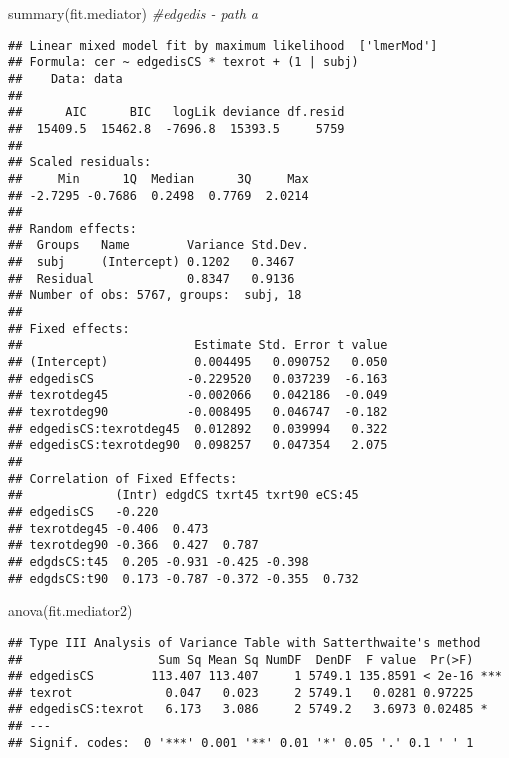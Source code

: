 \documentclass[
]{article}
\newenvironment{Shaded}{\begin{snugshade}}{\end{snugshade}}
\newcommand{\CommentTok}[1]{\textcolor[rgb]{0.56,0.35,0.01}{\textit{#1}}}
\newcommand{\FunctionTok}[1]{\textcolor[rgb]{0.00,0.00,0.00}{#1}}
\newcommand{\NormalTok}[1]{#1}
\begin{document}
\begin{Shaded}
\begin{Highlighting}[]
\FunctionTok{summary}\NormalTok{(fit.mediator) }\CommentTok{\#edgedis {-} path a}
\end{Highlighting}
\end{Shaded}

\begin{verbatim}
## Linear mixed model fit by maximum likelihood  ['lmerMod']
## Formula: cer ~ edgedisCS * texrot + (1 | subj)
##    Data: data
## 
##      AIC      BIC   logLik deviance df.resid 
##  15409.5  15462.8  -7696.8  15393.5     5759 
## 
## Scaled residuals: 
##     Min      1Q  Median      3Q     Max 
## -2.7295 -0.7686  0.2498  0.7769  2.0214 
## 
## Random effects:
##  Groups   Name        Variance Std.Dev.
##  subj     (Intercept) 0.1202   0.3467  
##  Residual             0.8347   0.9136  
## Number of obs: 5767, groups:  subj, 18
## 
## Fixed effects:
##                        Estimate Std. Error t value
## (Intercept)            0.004495   0.090752   0.050
## edgedisCS             -0.229520   0.037239  -6.163
## texrotdeg45           -0.002066   0.042186  -0.049
## texrotdeg90           -0.008495   0.046747  -0.182
## edgedisCS:texrotdeg45  0.012892   0.039994   0.322
## edgedisCS:texrotdeg90  0.098257   0.047354   2.075
## 
## Correlation of Fixed Effects:
##             (Intr) edgdCS txrt45 txrt90 eCS:45
## edgedisCS   -0.220                            
## texrotdeg45 -0.406  0.473                     
## texrotdeg90 -0.366  0.427  0.787              
## edgdsCS:t45  0.205 -0.931 -0.425 -0.398       
## edgdsCS:t90  0.173 -0.787 -0.372 -0.355  0.732
\end{verbatim}

\begin{Shaded}
\begin{Highlighting}[]
\FunctionTok{anova}\NormalTok{(fit.mediator2)}
\end{Highlighting}
\end{Shaded}

\begin{verbatim}
## Type III Analysis of Variance Table with Satterthwaite's method
##                   Sum Sq Mean Sq NumDF  DenDF  F value  Pr(>F)    
## edgedisCS        113.407 113.407     1 5749.1 135.8591 < 2e-16 ***
## texrot             0.047   0.023     2 5749.1   0.0281 0.97225    
## edgedisCS:texrot   6.173   3.086     2 5749.2   3.6973 0.02485 *  
## ---
## Signif. codes:  0 '***' 0.001 '**' 0.01 '*' 0.05 '.' 0.1 ' ' 1
\end{verbatim}
\end{document}

